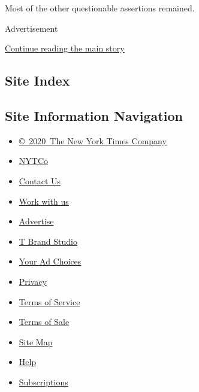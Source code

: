 Most of the other questionable assertions remained.

Advertisement

\protect\hyperlink{after-bottom}{Continue reading the main story}

\hypertarget{site-index}{%
\subsection{Site Index}\label{site-index}}

\hypertarget{site-information-navigation}{%
\subsection{Site Information
Navigation}\label{site-information-navigation}}

\begin{itemize}
\tightlist
\item
  \href{https://help.nytimes.com/hc/en-us/articles/115014792127-Copyright-notice}{©~2020~The
  New York Times Company}
\end{itemize}

\begin{itemize}
\tightlist
\item
  \href{https://www.nytco.com/}{NYTCo}
\item
  \href{https://help.nytimes.com/hc/en-us/articles/115015385887-Contact-Us}{Contact
  Us}
\item
  \href{https://www.nytco.com/careers/}{Work with us}
\item
  \href{https://nytmediakit.com/}{Advertise}
\item
  \href{http://www.tbrandstudio.com/}{T Brand Studio}
\item
  \href{https://www.nytimes.com/privacy/cookie-policy\#how-do-i-manage-trackers}{Your
  Ad Choices}
\item
  \href{https://www.nytimes.com/privacy}{Privacy}
\item
  \href{https://help.nytimes.com/hc/en-us/articles/115014893428-Terms-of-service}{Terms
  of Service}
\item
  \href{https://help.nytimes.com/hc/en-us/articles/115014893968-Terms-of-sale}{Terms
  of Sale}
\item
  \href{https://spiderbites.nytimes.com}{Site Map}
\item
  \href{https://help.nytimes.com/hc/en-us}{Help}
\item
  \href{https://www.nytimes.com/subscription?campaignId=37WXW}{Subscriptions}
\end{itemize}
